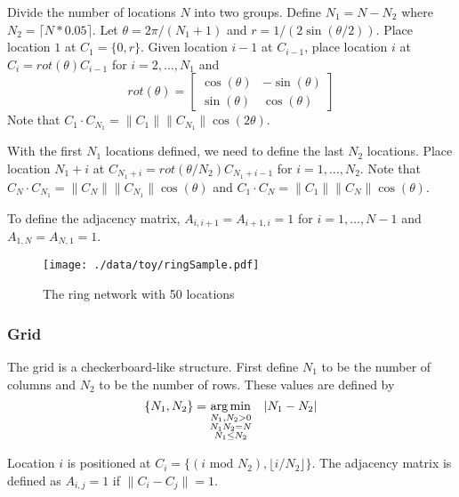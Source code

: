 \documentclass[11pt]{article}
\begin{document}
Divide the number of locations $N$ into two groups.  Define $N_1 = N -
N_2$ where $N_2 = \lceil N*0.05 \rceil$.  Let $\theta = 2\pi/(N_1+1)$
and $r = 1/(2\sin(\theta/2))$.  Place location $1$ at $C_1 = \lbrace
0,r \rbrace$.  Given location $i-1$ at $C_{i-1}$, place location $i$
at $C_i = rot(\theta) C_{i-1}$ for $i = 2,\ldots,N_1$ and
\begin{equation*}
  rot(\theta) = \left[
    \begin{matrix}
      \cos(\theta) & -\sin(\theta)\\
      \sin(\theta) & \cos(\theta)
    \end{matrix}
  \right]
\end{equation*}
Note that $C_{1} \cdot C_{N_1} = \|C_{1}\| \|C_{N_1}\| \cos(2\theta)$.

With the first $N_1$ locations defined, we need to define the last
$N_2$ locations.  Place location $N_1 + i$ at $C_{N_1 + i} =
rot(\theta/N_2)C_{N_1 + i - 1}$ for $i = 1,\ldots,N_2$.  Note that
$C_{N} \cdot C_{N_1} = \|C_{N}\| \|C_{N_1}\| \cos(\theta)$ and $C_{1}
\cdot C_{N} = \|C_{1}\| \|C_{N}\| \cos(\theta)$.

To define the adjacency matrix, $A_{i,i+1} = A_{i+1,i} = 1$ for $i =
1,\ldots,N-1$ and $A_{1,N} = A_{N,1} = 1$.



\begin{figure}[htb]
\centering
\texttt{[image: ./data/toy/ringSample.pdf]}
\caption{\label{fig:ring25}The ring network with 50 locations}
\end{figure}




\subsubsection{Grid}
\label{sec-3-1-4}

The grid is a checkerboard-like structure.  First define $N_1$ to be
the number of columns and $N_2$ to be the number of rows.  These
values are defined by
\begin{equation*}
  \lbrace N_1, N_2 \rbrace = \underset{
    \begin{subarray}{c}
      N_1,N_2 > 0\\
      N_1N_2 = N\\
      N_1 \le N_2
    \end{subarray}
  }{\arg\min} \quad |N_1 - N_2|
\end{equation*}

Location $i$ is positioned at $C_i = \lbrace (i \text{ mod } N_2), \lfloor
i/N_2 \rfloor \rbrace$.  The adjacency matrix is defined as $A_{i,j} =
1$ if $\|C_i - C_j\| = 1$.
\end{document}
